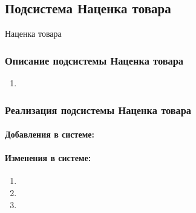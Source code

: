 \subsection{Подсистема Наценка товара} \hypertarget{4_1}{Наценка товара}
\subsubsection{Описание подсистемы Наценка товара}
\begin{enumerate}	
	\item 
\end{enumerate}
\subsubsection{Реализация подсистемы Наценка товара}
					\paragraph{Добавления в системе:}
\paragraph{Изменения в системе:}
\begin{enumerate}	
	\item 
\item 
\item 
\end{enumerate}